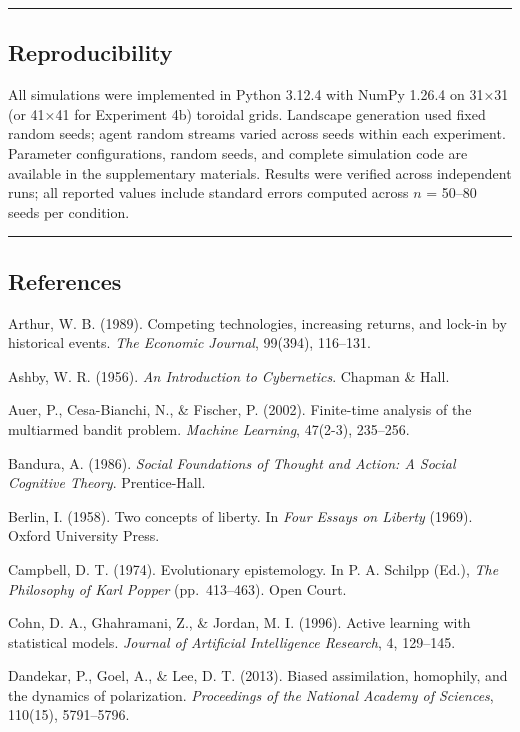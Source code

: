 \documentclass[
]{article}
\begin{document}
\begin{center}\rule{0.5\linewidth}{0.5pt}\end{center}

\subsection{Reproducibility}\label{reproducibility}

All simulations were implemented in Python 3.12.4 with NumPy 1.26.4 on
31×31 (or 41×41 for Experiment 4b) toroidal grids. Landscape generation
used fixed random seeds; agent random streams varied across seeds within
each experiment. Parameter configurations, random seeds, and complete
simulation code are available in the supplementary materials. Results
were verified across independent runs; all reported values include
standard errors computed across \(n\) = 50--80 seeds per condition.

\begin{center}\rule{0.5\linewidth}{0.5pt}\end{center}

\subsection{References}\label{references}

Arthur, W. B. (1989). Competing technologies, increasing returns, and
lock-in by historical events. \emph{The Economic Journal}, 99(394),
116--131.

Ashby, W. R. (1956). \emph{An Introduction to Cybernetics}. Chapman \&
Hall.

Auer, P., Cesa-Bianchi, N., \& Fischer, P. (2002). Finite-time analysis
of the multiarmed bandit problem. \emph{Machine Learning}, 47(2-3),
235--256.

Bandura, A. (1986). \emph{Social Foundations of Thought and Action: A
Social Cognitive Theory}. Prentice-Hall.

Berlin, I. (1958). Two concepts of liberty. In \emph{Four Essays on
Liberty} (1969). Oxford University Press.

Campbell, D. T. (1974). Evolutionary epistemology. In P. A. Schilpp
(Ed.), \emph{The Philosophy of Karl Popper} (pp.~413--463). Open Court.

Cohn, D. A., Ghahramani, Z., \& Jordan, M. I. (1996). Active learning
with statistical models. \emph{Journal of Artificial Intelligence
Research}, 4, 129--145.

Dandekar, P., Goel, A., \& Lee, D. T. (2013). Biased assimilation,
homophily, and the dynamics of polarization. \emph{Proceedings of the
National Academy of Sciences}, 110(15), 5791--5796.
\end{document}
